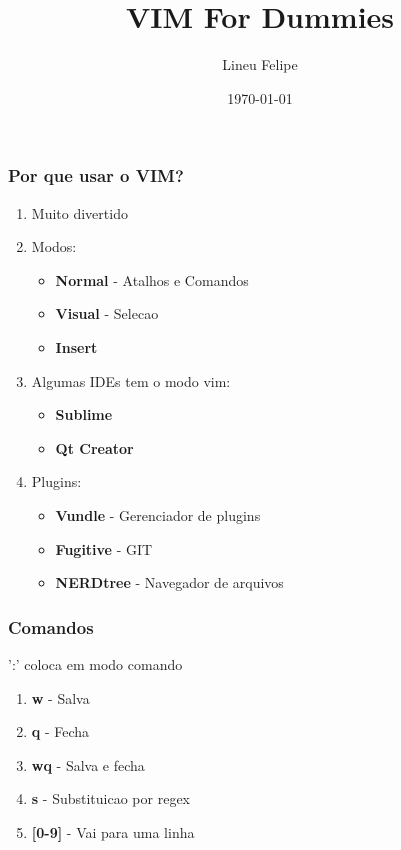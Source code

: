 \documentclass[aspectratio=169]{beamer}
\title[\sc{VIM For Dummies}]{VIM For Dummies}
\author[Lineu Felipe]{Lineu Felipe}
\institute{Socialbase} %
\date{\today}
\begin{document}
\begin{frame}
    \titlepage
\end{frame}

\begin{frame}\frametitle{Por que usar o VIM?}
    \pause
    \begin{enumerate}
        \item<1-> Muito divertido \pause
        \item<2-> Modos:
            \begin{itemize}
                \item \textbf{Normal} - Atalhos e Comandos
                \item \textbf{Visual} - Selecao
                \item \textbf{Insert}
            \end{itemize}
            \pause
        \item<3-> Algumas IDEs tem o modo vim:
            \begin{itemize}
                \item \textbf{Sublime}
                \item \textbf{Qt Creator}
            \end{itemize}
            \pause
        \item<4-> Plugins:
            \begin{itemize}
                \item \textbf{Vundle} - Gerenciador de plugins
                \item \textbf{Fugitive} - GIT
                \item \textbf{NERDtree} - Navegador de arquivos
            \end{itemize}
    \end{enumerate}
\end{frame}

\begin{frame}\frametitle{Comandos}
    ':' coloca em modo comando
    \begin{enumerate}
        \item \textbf{w} - Salva
        \item \textbf{q} - Fecha
        \item \textbf{wq} - Salva e fecha
        \item \textbf{s} - Substituicao por regex
        \item \textbf{[0-9]} - Vai para uma linha
    \end{enumerate}
\end{frame}
\end{document}
